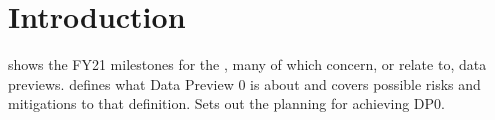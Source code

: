\section{Introduction}
 shows the FY21 milestones for the \VRO, many of which
concern, or relate to, data previews.
 defines what Data Preview 0 is about and covers possible risks and mitigations to that
definition.
 Sets out the planning for achieving DP0.






